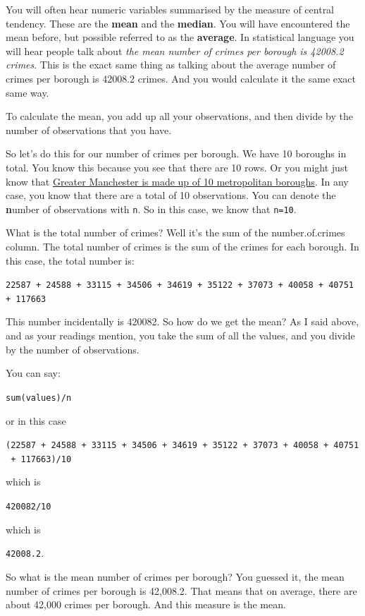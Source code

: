 \documentclass[
]{book}
\begin{document}
You will often hear numeric variables summarised by the measure of central tendency. These are the \textbf{mean} and the \textbf{median}. You will have encountered the mean before, but possible referred to as the \textbf{average}. In statistical language you will hear people talk about \emph{the mean number of crimes per borough is 42008.2 crimes}. This is the exact same thing as talking about the average number of crimes per borough is 42008.2 crimes. And you would calculate it the same exact same way.

To calculate the mean, you add up all your observations, and then divide by the number of observations that you have.

So let's do this for our number of crimes per borough. We have 10 boroughs in total. You know this because you see that there are 10 rows. Or you might just know that \href{https://www.britannica.com/place/Greater-Manchester}{Greater Manchester is made up of 10 metropolitan boroughs}. In any case, you know that there are a total of 10 observations. You can denote the \textbf{n}umber of observations with \texttt{n}. So in this case, we know that \texttt{n=10}.

What is the total number of crimes? Well it's the sum of the number.of.crimes column. The total number of crimes is the sum of the crimes for each borough. In this case, the total number is:

\texttt{22587\ +\ 24588\ +\ 33115\ +\ 34506\ +\ 34619\ +\ 35122\ +\ 37073\ +\ 40058\ +\ 40751\ +\ 117663}

This number incidentally is 420082. So how do we get the mean? As I said above, and as your readings mention, you take the sum of all the values, and you divide by the number of observations.

You can say:

\texttt{sum(values)/n}

or in this case

\texttt{(22587\ +\ 24588\ +\ 33115\ +\ 34506\ +\ 34619\ +\ 35122\ +\ 37073\ +\ 40058\ +\ 40751\ +\ 117663)/10}

which is

\texttt{420082/10}

which is

\texttt{42008.2}.

So what is the mean number of crimes per borough? You guessed it, the mean number of crimes per borough is 42,008.2. That means that on average, there are about 42,000 crimes per borough. And this measure is the mean.
\end{document}
